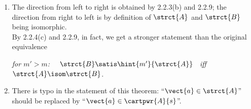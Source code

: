 \begin{enumerate}[1.]
%
\item {} The direction from left to right is obtained by 2.2.3(b) and 2.2.9; the direction from right to left is by definition of $\strct{A}$ and $\strct{B}$ being isomorphic.
\medskip\\
By 2.2.4(c) and 2.2.9, in fact, we get a stronger statement than the original equivalence
\begin{center}
\emph{for $m' > m$: \ \ $\strct{B} \satis \hint{m'}{\strct{A}}$ \ iff \ $\strct{A} \isom \strct{B}$.}
\end{center}
%
\item {} There is typo in the statement of this theorem: ``$\vect{a} \in \strct{A}$'' should be replaced by ``$\vect{a} \in \cartpwr{A}{s}$''.
%
\end{enumerate}


